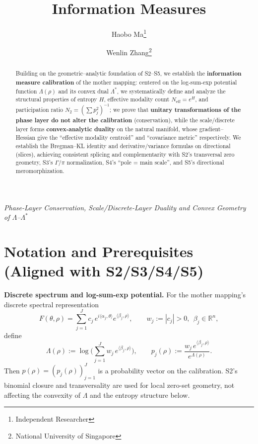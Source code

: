 \documentclass[11pt,a4paper]{article}
\title{Information Measures}
\author{Haobo Ma\thanks{Independent Researcher} \and Wenlin Zhang\thanks{National University of Singapore}}
\date{}
\theoremstyle{remark}
\begin{document}
\maketitle

\begin{center}
\textit{Phase-Layer Conservation, Scale/Discrete-Layer Duality and Convex Geometry of $\Lambda$--$\Lambda^\ast$}
\end{center}

\begin{abstract}
Building on the geometric--analytic foundation of S2--S5, we establish the \textbf{information measure calibration} of the mother mapping: centered on the log-sum-exp potential function $\Lambda(\rho)$ and its convex dual $\Lambda^\ast$, we systematically define and analyze the structural properties of entropy $H$, effective modality count $N_{\mathrm{eff}}=e^H$, and participation ratio $N_2=(\sum p_j^2)^{-1}$; we prove that \textbf{unitary transformations of the phase layer do not alter the calibration} (conservation), while the scale/discrete layer forms \textbf{convex-analytic duality} on the natural manifold, whose gradient--Hessian give the ``effective modality centroid'' and ``covariance metric'' respectively. We establish the Bregman--KL identity and derivative/variance formulas on directional (slices), achieving consistent splicing and complementarity with S2's transversal zero geometry, S3's $\Gamma/\pi$ normalization, S4's ``pole = main scale'', and S5's directional meromorphization.
\end{abstract}

\section{Notation and Prerequisites (Aligned with S2/S3/S4/S5)}

\textbf{Discrete spectrum and log-sum-exp potential.} For the mother mapping's discrete spectral representation
\begin{equation}
F(\theta,\rho)=\sum_{j=1}^J c_j\,e^{i\langle \alpha_j,\theta\rangle}e^{\langle \beta_j,\rho\rangle},\qquad
w_j:=|c_j|>0,\ \ \beta_j\in\mathbb{R}^n,
\end{equation}
define
\begin{equation}
\Lambda(\rho):=\log\Big(\sum_{j=1}^J w_j\,e^{\langle \beta_j,\rho\rangle}\Big),\qquad
p_j(\rho):=\frac{w_j\,e^{\langle \beta_j,\rho\rangle}}{e^{\Lambda(\rho)}}.
\end{equation}
Then $p(\rho)=(p_j(\rho))_{j=1}^J$ is a probability vector on the calibration. S2's binomial closure and transversality are used for local zero-set geometry, not affecting the convexity of $\Lambda$ and the entropy structure below.
\end{document}
